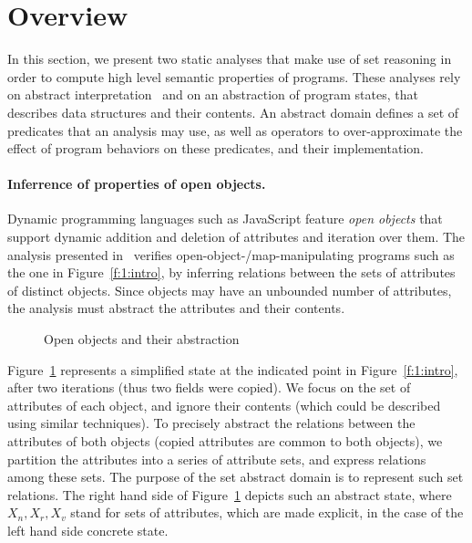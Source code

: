 \section{Overview}
\label{s:2:over}
In this section, we present two static analyses that make use of set
reasoning in order to compute high level semantic properties of
programs.
These analyses rely on abstract interpretation~\cite{cc:popl:77} and
on an abstraction of program states, that describes data structures
and their contents.
An abstract domain defines a set of predicates that an analysis may
use, as well as operators to over-approximate the effect of program
behaviors on these predicates, and their implementation.

\paragraph{Inferrence of properties of open objects.}
Dynamic programming languages such as JavaScript feature {\em open objects}
that support dynamic addition and deletion of attributes and iteration over
them.
The analysis presented in~\cite{hoo:14:sas} verifies
open-object-/map-manipulating programs such as the one
in Figure~\ref{f:1:intro}, by
inferring relations between the sets of attributes
of distinct objects.
Since objects may have an unbounded number of attributes, the analysis must 
abstract the attributes and their contents.
\newcommand{\varsrc}{\cvar{src}}
\newcommand{\vardst}{\cvar{dst}}
\begin{figure}[t]
  \newcommand{\picscale}{0.82}
  \centering
    \tikzpics{\picscale}{hoo-inv}
  \caption{Open objects and their abstraction}
  \label{f:2:hoo}
\end{figure}
Figure~\ref{f:2:hoo} represents a simplified state at the indicated
point in Figure~\ref{f:1:intro},
after two iterations (thus two fields were copied).
We focus on the set of attributes of each object, and ignore their
contents (which could be described using similar techniques).
To precisely abstract the relations between the attributes of both objects
(\eg copied attributes are common to both objects), we partition the
attributes into a series of attribute sets,
and express relations among these sets.
The purpose of the set abstract domain is to represent such set
relations.
The right hand side of Figure~\ref{f:2:hoo} depicts such an abstract
state, where \( X_n, X_r, X_v \) stand for sets of attributes, which are
made explicit, in the case of the left hand side concrete state.

